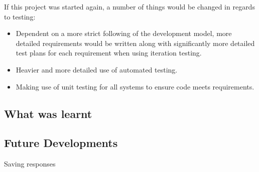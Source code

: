 \documentclass[a4papert,11pt,notitlepage]{article}
\begin{document}
If this project was started again, a number of things would be changed in regards to testing:
\begin{itemize}
\item Dependent on a more strict following of the development model, more detailed requirements would be written along with significantly more detailed test plans for each requirement when using iteration testing.
\item Heavier and more detailed use of automated testing.
\item Making use of unit testing for all systems to ensure code meets requirements.
\end{itemize}


\subsection{What was learnt}

\subsection{Future Developments}
Saving responses





\end{document}
